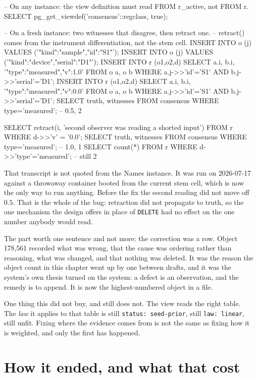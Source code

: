 \begin{Check}
-- On any instance: the view definition must read FROM r_active, not FROM r.
SELECT pg_get_viewdef('consensus'::regclass, true);

-- On a fresh instance: two witnesses that disagree, then retract one.
-- retract() comes from the instrument differentiation, not the stem cell.
INSERT INTO o (j) VALUES ('{"kind":"sample","id":"S1"}');
INSERT INTO o (j) VALUES ('{"kind":"device","serial":"D1"}');
INSERT INTO r (o1,o2,d)
  SELECT a.i, b.i, '{"type":"measured","v":1.0}' FROM o a, o b
  WHERE a.j->>'id'='S1' AND b.j->>'serial'='D1';
INSERT INTO r (o1,o2,d)
  SELECT a.i, b.i, '{"type":"measured","v":0.0}' FROM o a, o b
  WHERE a.j->>'id'='S1' AND b.j->>'serial'='D1';
SELECT truth, witnesses FROM consensus WHERE type='measured';   -- 0.5, 2

SELECT retract(i, 'second observer was reading a shorted input')
  FROM r WHERE d->>'v' = '0.0';
SELECT truth, witnesses FROM consensus WHERE type='measured';   -- 1.0, 1
SELECT count(*) FROM r WHERE d->>'type'='measured';             -- still 2
\end{Check}

That transcript is not quoted from the Names instance. It was run on 2026-07-17 against a throwaway container booted from the current stem cell, which is now the only way to run anything. Before the fix the second reading did not move off $0.5$. That is the whole of the bug: retraction did not propagate to truth, so the one mechanism the design offers in place of \texttt{DELETE} had no effect on the one number anybody would read.

The part worth one sentence and not more: the correction was a row. Object 178{,}561 recorded what was wrong, that the cause was ordering rather than reasoning, what was changed, and that nothing was deleted. It was the reason the object count in this chapter went up by one between drafts, and it was the system's own thesis turned on the system: a defect is an observation, and the remedy is to append. It is now the highest-numbered object in a file.

One thing this did not buy, and still does not. The view reads the right table. The \emph{law} it applies to that table is still \texttt{status: seed-prior}, still \texttt{law: linear}, still unfit. Fixing where the evidence comes from is not the same as fixing how it is weighted, and only the first has happened.

\section{How it ended, and what that cost}
\label{sec:bigbang}

